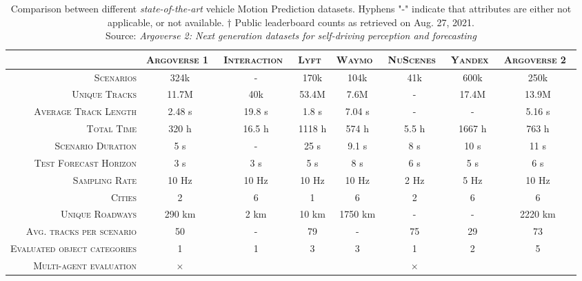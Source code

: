 \begin{table}[!tpbh]
	\centering
	\captionsetup{justification=justified}
	\caption[Comparison between different \textit{state-of-the-art} vehicle Motion Prediction datasets]{Comparison between different \textit{state-of-the-art} vehicle Motion Prediction datasets. Hyphens "-" indicate that attributes are either not applicable, or not available. $\dagger$ Public leaderboard counts as retrieved on Aug. 27, 2021. \\
	Source: \textit{Argoverse 2: Next generation datasets for self-driving perception and forecasting} \cite{wilson2023argoverse}}
	\label{table:2_motion_prediction_datasets_comparison}
	\begin{adjustbox}{max width=\columnwidth}
		\begingroup
		\renewcommand{\arraystretch}{1.25} %
		\begin{tabular}{rccccccc}
			\toprule
			& \textsc{Argoverse 1}~\cite{chang2019argoverse} & \textsc{Interaction}~\cite{zhan2019interaction} & \textsc{Lyft}~\cite{john2020one} & \textsc{Waymo}~\cite{ettinger2021large} & \textsc{NuScenes}~\cite{caesar2020nuscenes} & \textsc{Yandex}~\cite{malinin2021shifts} & \textsc{Argoverse 2}~\cite{wilson2023argoverse} \\
			\midrule
			\textsc{Scenarios} & 324k & - & 170k & 104k & 41k & 600k & 250k \\
			\textsc{Unique Tracks} & 11.7M  & 40k & 53.4M & 7.6M & - & 17.4M & 13.9M  \\
			\textsc{Average Track Length} & 2.48 s & 19.8 s & 1.8 s & 7.04 s & - & - & 5.16 s  \\
			\textsc{Total Time} & 320 h & 16.5 h & 1118 h & 574 h & 5.5 h & 1667 h & 763 h \\
			\textsc{Scenario Duration} & 5 s & - & 25 s & 9.1 s & 8 s & 10 s & 11 s \\
			\textsc{Test Forecast Horizon} & 3 s & 3 s & 5 s & 8 s & 6 s & 5 s & 6 s \\
			\textsc{Sampling Rate} & 10 Hz & 10 Hz & 10 Hz & 10 Hz & 2 Hz & 5 Hz & 10 Hz \\
			\textsc{Cities} & 2 & 6 & 1 & 6 & 2 & 6 & 6  \\
			\textsc{Unique Roadways} & 290 km & 2 km & 10 km & 1750 km & - & - & 2220 km \\
			\textsc{Avg. tracks per scenario} & 50 & - & 79 & - & 75 & 29 & 73\\
			\textsc{Evaluated object categories} & 1 & 1 & 3 & 3 & 1 & 2 & 5 \\
			\textsc{Multi-agent evaluation} & $\times$ & \checkmark & \checkmark & \checkmark & $\times$ & \checkmark &\checkmark \\

\end{tabular}
\end{adjustbox}
\end{table}
